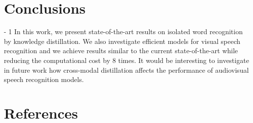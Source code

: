 \documentclass{article}
\begin{document}
\begin{table}
\begin{center}{}

\end{center}
\vspace{-3mm}
\caption{Performance of different efficient models on the LRW-1000 dataset. We use a sequence of 29-frame with a size of 112 by 112 to report multiply-add operations (FLOPs). The number of channels is scaled for different capacities, marked as $0.5 \times$ and $1 \times$. Channel widths are the standard ones for ShuffleNet v2, while base channel width for TCN is 256 channels.}
\label{tab:efficient_visual_lw_lrw1000}
\vspace{-4mm}
\end{table}

\section{Conclusions}
\looseness - 1
In this work, we present state-of-the-art results on isolated word recognition by knowledge distillation. We also investigate efficient models for visual speech recognition and we achieve results similar to the current state-of-the-art while reducing the computational cost by 8 times. It would be interesting to investigate in future work how cross-modal distillation affects the performance of audiovisual speech recognition models. 


\clearpage
\AtNextBibliography{\small}
\section{References}
\begingroup
\setlength\bibitemsep{1pt}
\printbibliography[heading=none]
\endgroup
\end{document}
